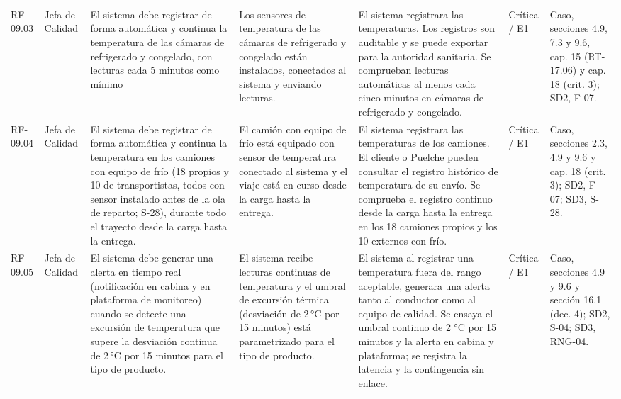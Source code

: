 {\begin{longtable}{@{}F{0.062} F{0.080} F{0.195} F{0.160} F{0.240} F{0.093} F{0.170}@{}}
  RF-09.03 & Jefa de Calidad & El sistema debe registrar de forma automática y continua la temperatura de las cámaras de refrigerado y congelado, con lecturas cada 5 minutos como mínimo & Los sensores de temperatura de las cámaras de refrigerado y congelado están instalados, conectados al sistema y enviando lecturas. & El sistema registrara las temperaturas. Los registros son auditable y se puede exportar para la autoridad sanitaria. Se comprueban lecturas automáticas al menos cada cinco minutos en cámaras de refrigerado y congelado. & Crítica / E1 & Caso, secciones 4.9, 7.3 y 9.6, cap. 15 (RT-17.06) y cap. 18 (crit. 3); SD2, F-07. \\
  RF-09.04 & Jefa de Calidad & El sistema debe registrar de forma automática y continua la temperatura en los camiones con equipo de frío (18 propios y 10 de transportistas, todos con sensor instalado antes de la ola de reparto; S-28), durante todo el trayecto desde la carga hasta la entrega. & El camión con equipo de frío está equipado con sensor de temperatura conectado al sistema y el viaje está en curso desde la carga hasta la entrega. & El sistema registrara las temperaturas de los camiones. El cliente o Puelche pueden consultar el registro histórico de temperatura de su envío. Se comprueba el registro continuo desde la carga hasta la entrega en los 18 camiones propios y los 10 externos con frío. & Crítica / E1 & Caso, secciones 2.3, 4.9 y 9.6 y cap. 18 (crit. 3); SD2, F-07; SD3, S-28. \\
  RF-09.05 & Jefa de Calidad & El sistema debe generar una alerta en tiempo real (notificación en cabina y en plataforma de monitoreo) cuando se detecte una excursión de temperatura que supere la desviación continua de 2\,°C por 15 minutos para el tipo de producto. & El sistema recibe lecturas continuas de temperatura y el umbral de excursión térmica (desviación de 2\,°C por 15 minutos) está parametrizado para el tipo de producto. & El sistema al registrar una temperatura fuera del rango aceptable, generara una alerta tanto al conductor como al equipo de calidad. Se ensaya el umbral continuo de 2 °C por 15 minutos y la alerta en cabina y plataforma; se registra la latencia y la contingencia sin enlace. & Crítica / E1 & Caso, secciones 4.9 y 9.6 y sección 16.1 (dec. 4); SD2, S-04; SD3, RNG-04. \\

\end{longtable}}
